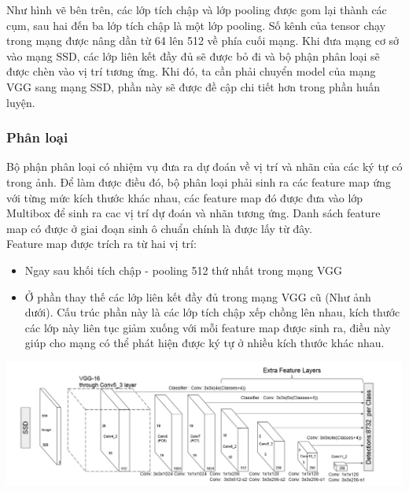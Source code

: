 \documentclass[a4paper,12pt]{article}
\begin{document}
	Như hình vẽ bên trên, các lớp tích chập và lớp pooling được gom lại thành các cụm, sau hai đến ba lớp tích chập là một lớp pooling. Số kênh của tensor chạy trong mạng được nâng dần từ 64 lên 512 về phía cuối mạng. Khi đưa mạng cơ sở vào mạng SSD, các lớp liên kết đầy đủ sẽ được bỏ đi và bộ phận phân loại sẽ được chèn vào vị trí tương ứng. Khi đó, ta cần phải chuyển model của mạng VGG sang mạng SSD, phần này sẽ được đề cập chi tiết hơn trong phần huấn luyện.
	
	\subsubsection* {Phân loại}
	
	Bộ phận phân loại có nhiệm vụ đưa ra dự đoán về vị trí và nhãn của các ký tự có trong ảnh. Để làm được điều đó, bộ phân loại phải sinh ra các feature map ứng với từng mức kích thước khác nhau, các feature map đó được đưa vào lớp Multibox để sinh ra cac vị trí dự đoán và nhãn tương ứng. Danh sách feature map có được ở giai đoạn sinh ô chuẩn chính là được lấy từ đây. \\
	
	Feature map được trích ra từ hai vị trí:
	
	\begin{itemize}
		\item Ngay sau khối tích chập - pooling 512 thứ nhất trong mạng VGG
		\item Ở phần thay thế các lớp liên kết đầy đủ trong mạng VGG cũ (Như ảnh dưới). Cấu trúc phần này là các lớp tích chập xếp chồng lên nhau, kích thước các lớp này liên tục giảm xuống với mỗi feature map được sinh ra, điều này giúp cho mạng có thể phát hiện được ký tự ở nhiều kích thước khác nhau.
	\end{itemize}
	
	\begin{center}
		
		\centering
		\includegraphics[width=0.8\linewidth]{SSD_Struture.png}
		\vspace{0.5cm}
	\end{center}
	
\end{document}
